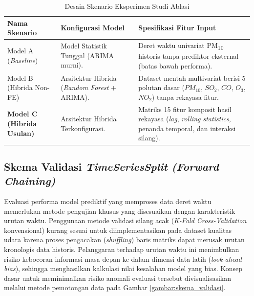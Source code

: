 \begin{table}[htbp]
\centering
\captionsetup{justification=centering}
\setlength{\tabcolsep}{6pt}
\caption{Desain Skenario Eksperimen Studi Ablasi}
\label{tbl:skenario_ablasi}

\begin{tabularx}{\textwidth}{|>{\raggedright\arraybackslash}p{2.8cm}|
                              >{\raggedright\arraybackslash}p{3.4cm}|
                              >{\raggedright\arraybackslash}X|}
\hline
\textbf{Nama Skenario} & \textbf{Konfigurasi Model} & \textbf{Spesifikasi Fitur Input} \\
\hline
Model A (\textit{Baseline}) & Model Statistik Tunggal (ARIMA murni). & Deret waktu univariat PM\textsubscript{10} historis tanpa prediktor eksternal (batas bawah performa). \\
\hline
Model B (Hibrida Non-FE) & Arsitektur Hibrida (\textit{Random Forest} + ARIMA). & Dataset mentah multivariat berisi 5 polutan dasar ($PM_{10}$, $SO_2$, $CO$, $O_3$, $NO_2$) tanpa rekayasa fitur. \\
\hline
\textbf{Model C (Hibrida Usulan)} & Arsitektur Hibrida Terkonfigurasi. & Matriks 15 fitur komposit hasil rekayasa (\textit{lag}, \textit{rolling statistics}, penanda temporal, dan interaksi silang). \\
\hline
\end{tabularx}
\end{table}

\subsection{Skema Validasi \textit{TimeSeriesSplit (Forward Chaining)}}

Evaluasi performa model prediktif yang memproses data deret waktu memerlukan metode pengujian khusus yang disesuaikan dengan karakteristik urutan waktu. Penggunaan metode validasi silang acak (\textit{K-Fold Cross-Validation} konvensional) kurang sesuai untuk diimplementasikan pada dataset kualitas udara karena proses pengacakan (\textit{shuffling}) baris matriks dapat merusak urutan kronologis data historis. Pelanggaran terhadap urutan waktu ini menimbulkan risiko kebocoran informasi masa depan ke dalam dimensi data latih (\textit{look-ahead bias}), sehingga menghasilkan kalkulasi nilai kesalahan model yang bias. Konsep dasar untuk meminimalkan risiko anomali evaluasi tersebut divisualisasikan melalui metode pemotongan data pada Gambar \ref{gambar:skema_validasi}.

